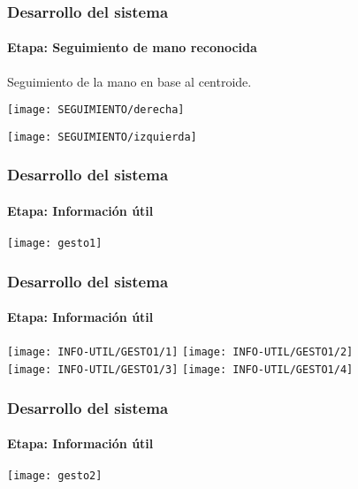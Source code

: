 \documentclass[xcolor=dvipsnames]{beamer}
\begin{document}
	\begin{frame}
		\transdissolve
		\frametitle{Desarrollo del sistema}
		\framesubtitle{Etapa: Seguimiento de mano reconocida}
		{\small{Seguimiento de la mano en base al centroide.}}
		\begin{center}
			\begin{minipage}[c]{.45\textwidth}
				\texttt{[image: SEGUIMIENTO/derecha]}
			\end{minipage}
			\begin{minipage}[c]{.45\textwidth}
				\texttt{[image: SEGUIMIENTO/izquierda]}
			\end{minipage}
		\end{center}
	\end{frame}


	\begin{frame}
		\transdissolve
		\frametitle{Desarrollo del sistema}
		\framesubtitle{Etapa: Información útil}
		\begin{center}
			\texttt{[image: gesto1]}
		\end{center}
	\end{frame}

	\begin{frame}
		\transdissolve
		\frametitle{Desarrollo del sistema}
		\framesubtitle{Etapa: Información útil}
		\begin{center}
			\texttt{[image: INFO-UTIL/GESTO1/1]} \hspace{.5cm}
			\texttt{[image: INFO-UTIL/GESTO1/2]}\\
			\vspace{.5cm}
			\texttt{[image: INFO-UTIL/GESTO1/3]} \hspace{.5cm}
			\texttt{[image: INFO-UTIL/GESTO1/4]}
		\end{center}
	\end{frame}

	\begin{frame}
		\transdissolve
		\frametitle{Desarrollo del sistema}
		\framesubtitle{Etapa: Información útil}
		\begin{center}
			\texttt{[image: gesto2]}
		\end{center}
	\end{frame}
\end{document}
